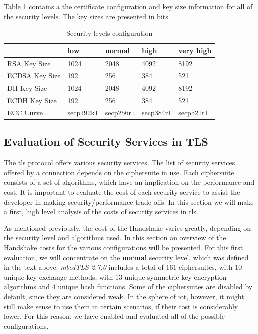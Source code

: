 \documentclass{llncs}
\begin{document}
Table \ref{table:sls-config-info} contains a the certificate configuration and key size information for all of the
security levels. The key sizes are presented in bits.

\begin{table}[]
\begin{tabular}{|l|l|l|l|l|}
\hline
               & \textbf{low} & \textbf{normal} & \textbf{high} & \textbf{very high} \\ \hline
RSA Key Size   & 1024         & 2048            & 4092          & 8192               \\ \hline
ECDSA Key Size & 192          & 256             & 384           & 521                \\ \hline
DH Key Size    & 1024         & 2048            & 4092          & 8192               \\ \hline
ECDH Key Size  & 192          & 256             & 384           & 521                \\ \hline
ECC Curve      & secp192k1    & secp256r1       & secp384r1     & secp521r1          \\ \hline
\end{tabular}
\centering \caption{\label{table:sls-config-info} Security levels configuration}
\end{table}

\subsection{Evaluation of Security Services in TLS} \label{sec:ss-overview}

The \gls{tls} protocol offers various security services. The list of security services offered by a connection
depends on the ciphersuite in use. Each ciphersuite consists of a set of algorithms, which have an implication
on the performance and cost. It is important to evaluate the cost of each security service to assist the developer in making
security/performance trade-offs. In this section we will make a first, high level analysis of the
costs of security services in \gls{tls}.

As mentioned previously, the cost of the Handshake varies greatly, depending on the security level and algorithms used.
In this section an overview of the Handshake costs for the various configurations will be presented. For this
first evaluation, we will concentrate on the \textbf{normal} security level, which was defined in the text above.
\textit{mbedTLS 2.7.0} includes a total of $161$ ciphersuites, with $10$ unique key exchange methods, with $13$ unique
symmetric key encryption algorithms and $4$ unique hash functions. Some of the ciphersuites are disabled by default,
since they are considered weak. In the sphere of \gls{iot}, however, it might still make sense to use them in certain
scenarios, if their cost is considerably lower. For this reason, we have enabled and evaluated all of the possible configurations.
\end{document}
